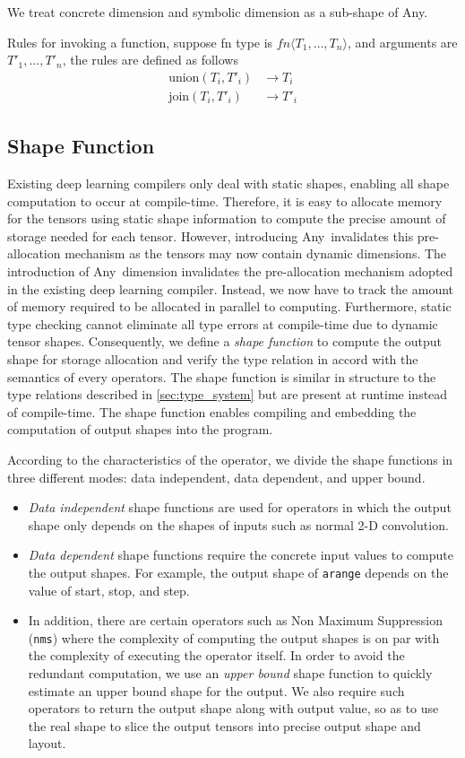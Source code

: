 We treat concrete dimension and symbolic dimension as a sub-shape of Any.

Rules for invoking a function, suppose fn type is $fn\langle T_1, \dots, T_n\rangle$,
and arguments are $T'_1, \dots, T'_n$, the rules are defined as follows
\begin{align*}
  \textrm{union}(T_i, T'_i) &\rightarrow T_i \\
  \textrm{join}(T_i, T'_i) &\rightarrow T'_i
\end{align*}

\subsection{Shape Function}
\label{sec:type_systemTech:shape-func}
Existing deep learning compilers only deal with static shapes,
  enabling all shape computation to occur at compile-time.
Therefore, it is easy to allocate memory for the tensors
  using static shape information to compute the precise amount of storage needed for each tensor.
However, introducing Any~invalidates this pre-allocation
  mechanism as the tensors may now contain dynamic dimensions.
The introduction of Any~dimension invalidates the pre-allocation
  mechanism adopted in the existing deep learning compiler.
Instead, we now have to track the amount of memory required to be allocated in parallel to computing.
Furthermore, static type checking cannot eliminate all
  type errors at compile-time due to dynamic tensor shapes.
Consequently, we define a {\em shape function} to compute the output shape
  for storage allocation and verify the type relation in accord with the semantics of every operators.
The shape function is similar in structure to the type relations described in
  \ref{sec:type_system} but are present at runtime instead of compile-time.
The shape function enables compiling and embedding the computation of output shapes into the program.

According to the characteristics of the operator, we divide the shape functions
  in three different modes: data independent, data dependent, and upper bound.
\begin{itemize}
  \item {\em Data independent} shape functions are used for operators in which the output shape
        only depends on the shapes of inputs such as normal 2-D convolution.
  \item {\em Data dependent} shape functions require the concrete input values to compute the output shapes.
        For example, the output shape of \texttt{arange} depends on the value of start, stop, and step.
  \item In addition, there are certain operators such as Non Maximum Suppression (\texttt{nms}) where the
        complexity of computing the output shapes is on par with the complexity of executing the operator itself.
  In order to avoid the redundant computation, we use an {\em upper bound} shape function to quickly estimate an upper bound shape for the output.
  We also require such operators to return the output shape along with output value, so as to use the real shape to slice the output tensors into precise output shape and layout.
\end{itemize}

